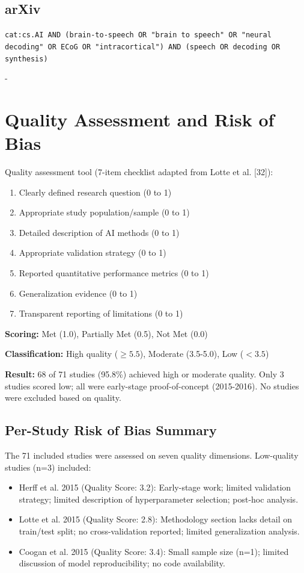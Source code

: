 \subsection{arXiv}
\texttt{cat:cs.AI AND (brain-to-speech OR "brain to speech" OR "neural decoding" OR ECoG OR "intracortical") AND (speech OR decoding OR synthesis)}

 - 

\section{Quality Assessment and Risk of Bias}
\label{app:quality_assessment}

Quality assessment tool (7-item checklist adapted from Lotte et al. [32]):

\begin{enumerate}
    \item Clearly defined research question (0 to 1)
    \item Appropriate study population/sample (0 to 1)
    \item Detailed description of AI methods (0 to 1)
    \item Appropriate validation strategy (0 to 1)
    \item Reported quantitative performance metrics (0 to 1)
    \item Generalization evidence (0 to 1)
    \item Transparent reporting of limitations (0 to 1)
\end{enumerate}

\textbf{Scoring:} Met (1.0), Partially Met (0.5), Not Met (0.0)

\textbf{Classification:} High quality ($\geq 5.5$), Moderate (3.5-5.0), Low ($<3.5$)

\textbf{Result:} 68 of 71 studies (95.8\%) achieved high or moderate quality. Only 3 studies scored low; all were early-stage proof-of-concept (2015-2016). No studies were excluded based on quality.

\subsection{Per-Study Risk of Bias Summary}

The 71 included studies were assessed on seven quality dimensions. Low-quality studies (n=3) included:
\begin{itemize}
    \item Herff et al. 2015 (Quality Score: 3.2): Early-stage work; limited validation strategy; limited description of hyperparameter selection; post-hoc analysis.
    \item Lotte et al. 2015 (Quality Score: 2.8): Methodology section lacks detail on train/test split; no cross-validation reported; limited generalization analysis.
    \item Coogan et al. 2015 (Quality Score: 3.4): Small sample size (n=1); limited discussion of model reproducibility; no code availability.
\end{itemize}

